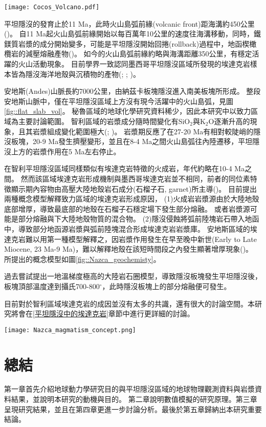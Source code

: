 \begin{figure*}[ht!]
    \centering
    \texttt{[image: Cocos\_Volcano.pdf]}
    \caption[]{
    }
    \label{fig::Cocos_geochemisty}
\end{figure*}

平坦隱沒的發育止於11 Ma，此時火山島弧前緣(volcanic front)距海溝約450公里(\citealp{Manea2011Thermal})。
自11 Ma起火山島弧前緣開始以每百萬年10公里的速度往海溝移動，同時，鐵鎂質岩漿的成分開始變多，可能是平坦隱沒開始回捲(rollback)過程中，地函楔橄欖岩的減壓熔融產物(\citealp{gomez2003temporal})。
如今的火山島弧前緣約略與海溝距離350公里，有穩定活躍的火山活動現象。
目前學界一致認同墨西哥平坦隱沒區域所發現的埃達克岩樣本皆為隱沒海洋地殼與沉積物的產物(\citealp{Gutscher2000Bcan}; \citealp{ferrari2012dynamic}; \citealp{Manea2017})。

安地斯(Andes)山脈長約7000公里，由納茲卡板塊隱沒進入南美板塊所形成。
整段安地斯山脈中，僅在平坦隱沒區域上方沒有現今活躍中的火山島弧，見圖\ref{fig::flat_slab_vol}。
秘魯區域的地球化學研究資料稀少，因此本研究中以致力區域為主要討論範圍。
智利區域的岩漿成分隨時間變化有SiO$_2$與K$_2$O逐漸升高的現象，且其岩漿組成變化範圍極大(\citealp{kay1988tertiary}; \citealp{kay2002magmatism})。
岩漿期反應了在27-20 Ma有相對較陡峭的隱沒板塊，20-9 Ma發生擠壓變形，並且在8-4 Ma之間火山島弧往內陸遷移，平坦隱沒上方的岩漿作用在5 Ma左右停止。

在智利平坦隱沒區域同樣類似有埃達克岩特徵的火成岩，年代約略在10-4 Ma之間。
然而該區域埃達克岩形成機制與墨西哥埃達克岩並不相同，前者的同位素特徵顯示期內容物由高壓大陸地殼岩石成分(石榴子石, garnet)所主導(\citealp{kay2002magmatism})。
目前提出兩種概念模型解釋致力區域的埃達克岩形成原因，
(1)火成岩岩漿源由於大陸地殼底部增厚，導致最底部的地殼在石榴子石穩定場下發生部分熔融。
或者岩漿源可能是部分熔融與下大陸地殼物質的混合物。
(2)隱沒侵蝕將弧前陸塊岩石帶入地函中，導致部分地函源岩漿與弧前陸塊混合形成埃達克岩岩漿庫。
安地斯區域的埃達克岩難以用第一種模型解釋之，因岩漿作用發生在早至晚中新世(Early to Late Miocene, 23 Ma-9 Ma)，難以解釋地殼在該短時間段之內發生顯著增厚現象(\citealp{kay2002magmatism})。
\citealp{kay2002magmatism}所提出的概念模型如圖\ref{fig::Nazca_geochemisty}。

過去\citealp{Gutscher2000Bcan}嘗試提出一地溫梯度極高的大陸岩石圈模型，導致隱沒板塊發生平坦隱沒後，板塊頂部溫度達到攝氏700-800$^{\circ}$，此時隱沒板塊上的部分熔融便可發生。

目前對於智利區域埃達克岩的成因並沒有太多的共識，還有很大的討論空間。本研究將會在\ref{平坦隱沒中的埃達克岩}章節中進行更詳細的討論。

\begin{figure*}[h!]
    \centering
    \texttt{[image: Nazca\_magmatism\_concept.png]}
    \caption[智利平坦隱沒區域岩漿活動概念模型]{智利平坦隱沒區域岩漿活動概念模型，摘自\citealp{kay2002magmatism}
    }
    \label{fig::Nazca_geochemisty}
\end{figure*}

\section{總結}
第一章首先介紹地球動力學研究目的與平坦隱沒區域的地球物理觀測資料與岩漿資料結果，並說明本研究的動機與目的。
第二章說明數值模擬的研究原理。第三章呈現研究結果，並且在第四章更進一步討論分析。最後於第五章歸納出本研究重要結論。